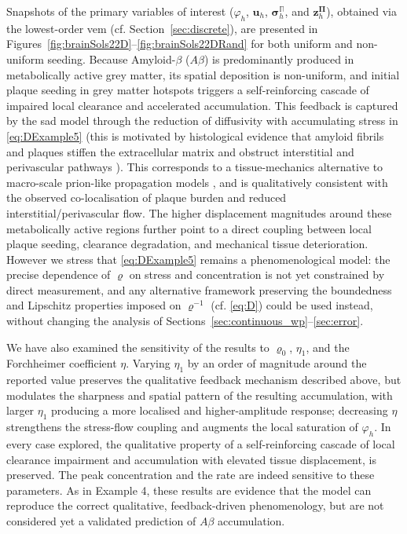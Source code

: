 \documentclass[fleqn,a4paper]{cas-sc}
\newcommand{\bu}{\boldsymbol{u}}
\newcommand{\bz}{\boldsymbol{z}}
\newcommand{\bPi}{\boldsymbol{\Pi}}
\newcommand{\0}{\boldsymbol{0}}
\newcommand\bbPi{\mathbb{\Pi}}
\newcommand\bsigma{\boldsymbol{\sigma}}
\numberwithin{equation}{section}
\numberwithin{figure}{section}
\begin{document}
{Snapshots of the primary variables of interest ($\varphi_h$, $\bu_h$, $\bsigma_h^{\bbPi}$, and $\bz_h^{\bPi}$), obtained via the lowest-order \gls{vem} (cf. Section~\ref{sec:discrete}), are presented in Figures~\ref{fig:brainSols22D}--\ref{fig:brainSols22DRand} for both uniform and non-uniform seeding. Because Amyloid-$\beta$ ($A\beta$) is predominantly produced in metabolically active grey matter, its spatial deposition is   non-uniform, and initial plaque seeding in grey matter hotspots triggers a self-reinforcing cascade of impaired local clearance and accelerated accumulation. This feedback is captured by the \gls{sad} model through the reduction of diffusivity with accumulating stress in \eqref{eq:DExample5} (this is  motivated by histological evidence that amyloid fibrils and plaques stiffen the extracellular matrix and obstruct interstitial and perivascular pathways \cite{schmit2011drives,iorio2025fluid}). This corresponds to a tissue-mechanics alternative to macro-scale prion-like propagation models \cite{weickenmeier2018multiphysics}, and is qualitatively consistent with the  observed co-localisation of plaque burden and reduced interstitial/perivascular flow. The higher displacement magnitudes around these metabolically active regions further point to a direct  coupling between local plaque seeding, clearance degradation, and mechanical tissue deterioration. However we stress that \eqref{eq:DExample5} remains a phenomenological model: the precise dependence of $\varrho$ on stress and concentration is not yet constrained by direct measurement, and any alternative framework preserving the boundedness and Lipschitz properties imposed on $\varrho^{-1}$ (cf. \eqref{eq:D}) could be used instead, without changing the analysis of Sections~\ref{sec:continuous_wp}--\ref{sec:error}.

We have also examined the sensitivity of the results to  $\varrho_0$, $\eta_1$, and the Forchheimer coefficient $\eta$. Varying $\eta_1$ by an order of magnitude around the reported value preserves the qualitative feedback mechanism described above, but modulates the sharpness and spatial pattern of the resulting accumulation, with larger $\eta_1$ producing a more localised and higher-amplitude response; decreasing $\eta$ strengthens the stress-flow coupling and augments the local saturation of $\varphi_h$. In every case explored, the qualitative property of a self-reinforcing cascade of local clearance impairment and accumulation  with elevated tissue displacement, is preserved. The peak concentration and the rate  are indeed sensitive to these parameters. As in Example 4, these results are evidence that the model can reproduce the correct qualitative, feedback-driven phenomenology, but are not considered yet  a  validated prediction of $A\beta$ accumulation.}
\end{document}
